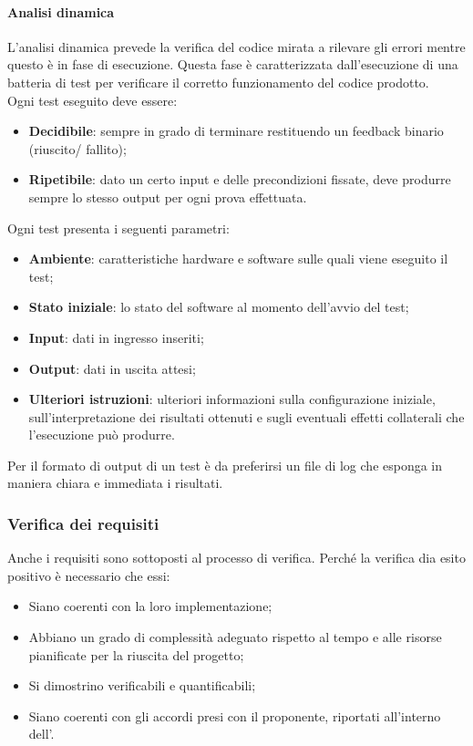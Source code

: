 \paragraph{Analisi dinamica}
L'analisi dinamica prevede la verifica del codice mirata a rilevare gli errori mentre questo è in fase di esecuzione.  Questa fase è caratterizzata dall'esecuzione di una batteria di test per verificare il corretto funzionamento del codice prodotto.\\
Ogni test eseguito deve essere:
\begin{itemize}
    \item \textbf{Decidibile}: sempre in grado di terminare restituendo un feedback binario (riuscito/ fallito);
    \item \textbf{Ripetibile}: dato un certo input e delle precondizioni fissate, deve produrre sempre lo stesso output per ogni prova effettuata.
\end{itemize}
Ogni test presenta i seguenti parametri:
\begin{itemize}
    \item \textbf{Ambiente}: caratteristiche hardware e software sulle quali viene eseguito il test;
    \item \textbf{Stato iniziale}: lo stato del software al momento dell'avvio del test;
    \item \textbf{Input}: dati in ingresso inseriti;
    \item \textbf{Output}: dati in uscita attesi;
    \item \textbf{Ulteriori istruzioni}: ulteriori informazioni sulla configurazione iniziale, sull'interpretazione dei risultati ottenuti e sugli eventuali effetti collaterali che l'esecuzione può produrre.
\end{itemize}
Per il formato di output di un test è da preferirsi un file di log che esponga in maniera chiara e immediata i risultati.

\subsubsection{Verifica dei requisiti}
Anche i requisiti sono sottoposti al processo di verifica. Perché la verifica dia esito positivo è necessario che essi:

\begin{itemize}
    \item Siano coerenti con la loro implementazione;
    \item Abbiano un grado di complessità adeguato rispetto al tempo e alle risorse pianificate per la riuscita del progetto;
    \item Si dimostrino verificabili e quantificabili;
    \item Siano coerenti con gli accordi presi con il proponente, riportati all'interno dell'.
\end{itemize}

